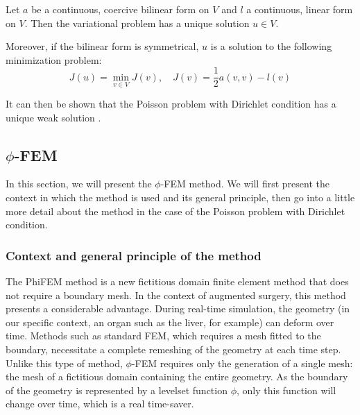 \begin{Prop}
	
	Let $a$ be a continuous, coercive bilinear form on $V$ and $l$ a continuous, linear form on $V$. Then the variational problem has a unique solution $u\in V$. 
	
	Moreover, if the bilinear form is symmetrical, $u$ is a solution to the following minimization problem:
	\begin{equation*}
		J(u)=\min_{v\in V} J(v), \quad J(v)=\frac{1}{2}a(v,v)-l(v)
	\end{equation*}
\end{Prop}

It can then be shown that the Poisson problem with Dirichlet condition has a unique weak solution .





\newpage

\subsection{$\phi$-FEM}

In this section, we will present the $\phi$-FEM method. We will first present the context in which the method is used and its general principle, then go into a little more detail about the method in the case of the Poisson problem with Dirichlet condition. 

\subsubsection{Context and general principle of the method}

The PhiFEM method is a new fictitious domain finite element method that does not require a boundary mesh. In the context of augmented surgery, this method presents a considerable advantage. During real-time simulation, the geometry (in our specific context, an organ such as the liver, for example) can deform over time. Methods such as standard FEM, which requires a mesh fitted to the boundary, necessitate a complete remeshing of the geometry at each time step. Unlike this type of method, $\phi$-FEM requires only the generation of a single mesh: the mesh of a fictitious domain containing the entire geometry. As the boundary of the geometry is represented by a levelset function $\phi$, only this function will change over time, which is a real time-saver.

